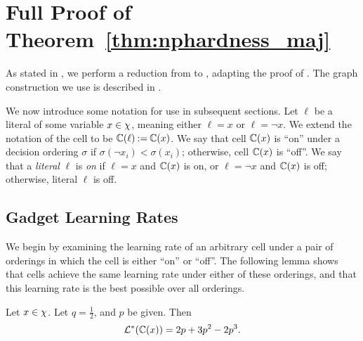 \section{Full Proof of Theorem~\ref{thm:nphardness_maj}}
\label{app:majority_proof}

As stated in , we perform a reduction from \sat{} to \netlearn{}, adapting the proof of .
The graph construction we use is described in .

We now introduce some notation for use in subsequent sections.
Let $ \ell $ be a literal of some variable $ x \in \chi $, meaning either $ \ell = x $ or $ \ell = \lnot x $.
We extend the notation of the cell to be $ \mathbb{C}\!\left(\ell\right) \mathbin{:=} \mathbb{C}\!\left(x\right) $.
We say that cell $\mathbb{C}\!\left(x\right)$ is ``on'' under a decision ordering $\sigma$ if $\sigma(\lnot x_i) < \sigma(x_i)$; otherwise, cell $\mathbb{C}\!\left(x\right)$ is ``off''.
We say that a \emph{literal} $ \ell $ is \emph{on} if $ \ell = x $ and $ \mathbb{C}\!\left(x\right) $ is on, or $ \ell = \lnot x $ and $ \mathbb{C}\!\left(x\right) $ is off; otherwise, literal $ \ell $ is off.


\subsection{Gadget Learning Rates}
We begin by examining the learning rate of an arbitrary cell under a pair of orderings in which the cell is either ``on'' or ``off''. The following lemma shows that cells achieve the same learning rate under either of these orderings, and that this learning rate is the best possible over all orderings. 

\begin{lemma} \label{lemma:MD_cellLearningRate}
    Let $x \in \chi$.
    Let $ q = \frac 12 $, and $ p $ be given.
    Then \[
	\mathcal{L}^* (\mathbb{C}\!\left(x\right)) = 2p + 3p^2 -2p^3.
    \]
\end{lemma}

